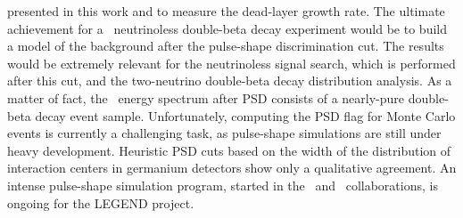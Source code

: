 presented in this work and to measure the dead-layer growth rate.
\newpar
The ultimate achievement for a \gesix\ neutrinoless double-beta decay experiment would be
to build a model of the background after the pulse-shape discrimination cut. The results
would be extremely relevant for the neutrinoless signal search, which is performed after
this cut, and the two-neutrino double-beta decay distribution analysis. As a matter of
fact, the \gerda\ energy spectrum after PSD consists of a nearly-pure double-beta decay
event sample. Unfortunately, computing the PSD flag for Monte Carlo events is currently a
challenging task, as pulse-shape simulations are still under heavy development. Heuristic
PSD cuts based on the width of the distribution of interaction centers in germanium
detectors show only a qualitative agreement. An intense pulse-shape simulation program,
started in the \gerda\ and \majorana\ collaborations, is ongoing for the LEGEND project.

\chapendgliph{}

